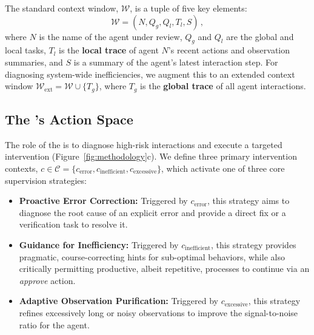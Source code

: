 \begin{definition}
    The standard context window, $\mathcal{W}$, is a tuple of five key elements:
    \[
        \mathcal{W} = (N, Q_g, Q_l, T_l, S) \,,
    \]
    where $N$ is the name of the agent under review, $Q_g$ and $Q_l$ are the global and local tasks, $T_l$ is the \textbf{local trace} of agent $N$'s recent actions and observation summaries, and $S$ is a summary of the agent's latest interaction step.
    For diagnosing system-wide inefficiencies, we augment this to an extended context window $\mathcal{W}_{\text{ext}} = \mathcal{W} \cup \{T_g\}$, where $T_g$ is the \textbf{global trace} of all agent interactions.
\end{definition}






\subsection{The \method's Action Space}
The role of the \method is to diagnose high-risk interactions and execute a targeted intervention (Figure~\ref{fig:methodology}c). We define three primary intervention contexts, $c \in \mathcal{C} = \{c_{\text{error}}, c_{\text{inefficient}}, c_{\text{excessive}} \}$, which activate one of three core supervision strategies:

\begin{itemize}[nosep, leftmargin=12pt,labelindent=0pt]
    \item \textbf{Proactive Error Correction:} Triggered by $c_{\text{error}}$, this strategy aims to diagnose the root cause of an explicit error and provide a direct fix or a verification task to resolve it.
    \item \textbf{Guidance for Inefficiency:} Triggered by $c_{\text{inefficient}}$, this strategy provides pragmatic, course-correcting hints for sub-optimal behaviors, while also critically permitting productive, albeit repetitive, processes to continue via an \textit{approve} action.
    \item \textbf{Adaptive Observation Purification:} Triggered by $c_{\text{excessive}}$, this strategy refines excessively long or noisy observations to improve the signal-to-noise ratio for the agent.
\end{itemize}

